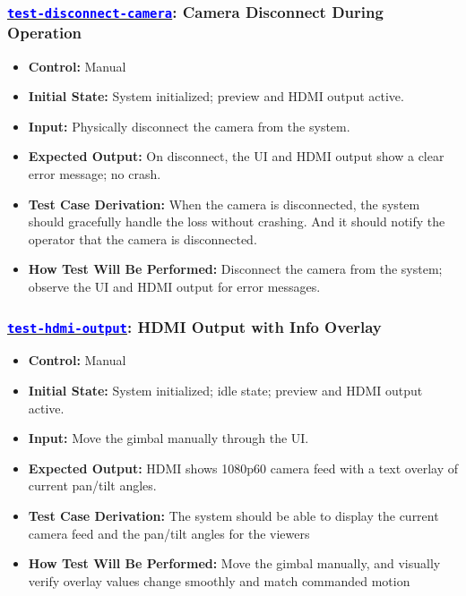 \documentclass[12pt, titlepage]{article}
\newcommand{\tid}[1]{\hyperlink{tid:#1}{\textcolor{blue}{\texttt{#1}}}}
\begin{document}
\subsubsection*{\tid{test-disconnect-camera}: Camera Disconnect During Operation}
\begin{itemize}
  \item \textbf{Control:} Manual
  \item \textbf{Initial State:} System initialized; preview and HDMI output active.
  \item \textbf{Input:} Physically disconnect the camera from the system.
  \item \textbf{Expected Output:} On disconnect, the UI and HDMI output show a clear error message; no crash.
  \item \textbf{Test Case Derivation:} When the camera is disconnected, the system should gracefully handle the loss without crashing. And it should notify the operator that the camera is disconnected.
  \item \textbf{How Test Will Be Performed:} Disconnect the camera from the system; observe the UI and HDMI output for error messages.
\end{itemize}

\subsubsection*{\tid{test-hdmi-output}: HDMI Output with Info Overlay}
\begin{itemize}
  \item \textbf{Control:} Manual
  \item \textbf{Initial State:} System initialized; idle state; preview and HDMI output active.
  \item \textbf{Input:} Move the gimbal manually through the UI.
  \item \textbf{Expected Output:} HDMI shows 1080p60 camera feed with a text overlay of current pan/tilt angles.
  \item \textbf{Test Case Derivation:} The system should be able to display the current camera feed and the pan/tilt angles for the viewers
  \item \textbf{How Test Will Be Performed:} Move the gimbal manually, and visually verify overlay values change smoothly and match commanded motion
\end{itemize}
\end{document}
